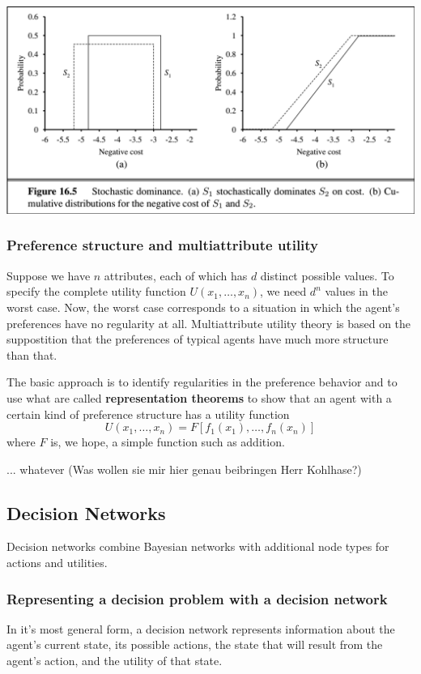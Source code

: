 \documentclass{scrartcl}
\begin{document}
\begin{center}
    \includegraphics[scale=0.4]{img/statdom.png}
\end{center}

\subsubsection{Preference structure and multiattribute utility}
Suppose we have \(n\) attributes, each of which has \(d\) distinct possible values. To specify the complete utility function \(U(x_1, \dots, x_n)\), we need \(d^n\) values in the worst case. Now, the worst case corresponds to a situation in which the agent's preferences have no regularity at all. Multiattribute utility theory is based on the suppostition that the preferences of typical agents have much more structure than that.

The basic approach is to identify regularities in the preference behavior and to use what are called \textbf{representation theorems} to show that an agent with a certain kind of preference structure has a utility function
\[U(x_1, \dots, x_n) = F[f_1(x_1), \dots, f_n(x_n)]\]
where \(F\) is, we hope, a simple function such as addition.

... whatever (Was wollen sie mir hier genau beibringen Herr Kohlhase?)

\subsection{Decision Networks}
Decision networks combine Bayesian networks with additional node types for actions and utilities.

\subsubsection{Representing a decision problem with a decision network}
In it's most general form, a decision network represents information about the agent's current state, its possible actions, the state that will result from the agent's action, and the utility of that state.
\end{document}
